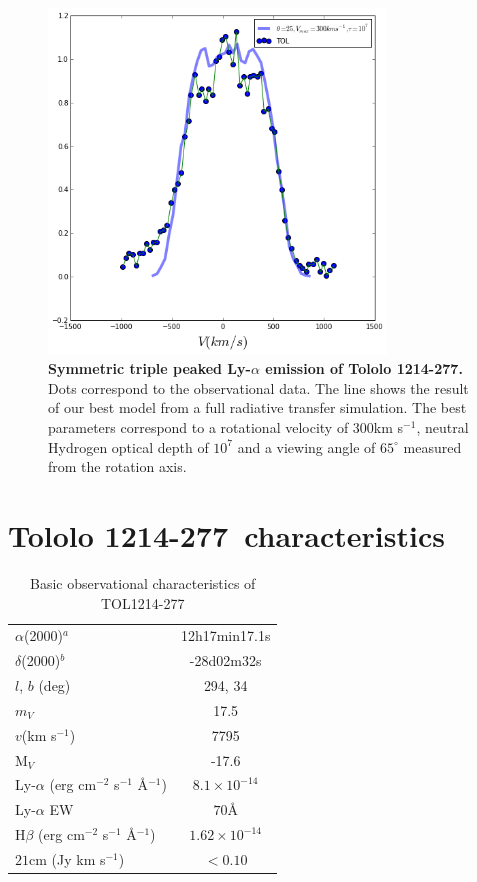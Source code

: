 \documentclass[a4paper, usenatbib, 12pt]{article}
\newcommand{\tol}{Tololo 1214-277}
\begin{document}
{\begin{figure}
\begin{center}
\includegraphics[width=0.8\textwidth]{tolfit.png}
\caption{{\bf Symmetric triple peaked Ly-$\alpha$ emission of \tol.}
  Dots correspond to the observational data. The line shows the result
of our best model from a full radiative transfer simulation. The best
parameters correspond to a rotational velocity of $300$km s$^{-1}$,
neutral Hydrogen optical depth of $10^{7}$ and a viewing angle of
$65^{\circ}$ measured from the rotation axis.} 
\end{center}
\end{figure}

{}


\newpage 

\section*{\tol\ characteristics}


\begin{table}
\begin{center}
\begin{tabular}{lc}
$\alpha$(2000)$^{a}$ & 12h17min17.1s\\
$\delta$(2000)$^{b}$ & -28d02m32s\\
$l$, $b$ (deg) & 294, 34\\
$m_V$ & 17.5\\
$v$(km s$^{-1}$) & 7795\\
M$_V$ & -17.6\\ 
Ly-$\alpha$ (erg cm$^{-2}$ s$^{-1}$ \AA$^{-1}$)& $8.1\times 10^{-14}$ \\
Ly-$\alpha$ EW & $70$\AA\\
H$\beta$ (erg cm$^{-2}$ s$^{-1}$ \AA$^{-1}$) & $1.62\times 10^{-14}$ \\
$21$cm (Jy km s$^{-1}$)& $<0.10$ \\
\end{tabular}
\end{center}
\caption{Basic observational characteristics of TOL1214-277
  \cite{Thuan97}\\} 
\end{table}



}
\end{document}
